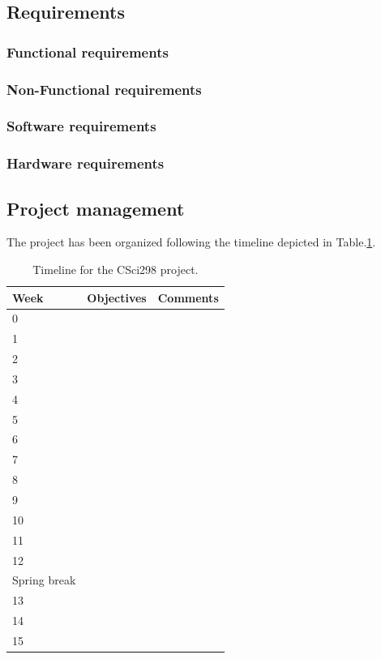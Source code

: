 \documentclass[12pt,onecolumn]{article}
\begin{document}
\subsection{Requirements}

\subsubsection{Functional requirements}

\subsubsection{Non-Functional requirements}

\subsubsection{Software requirements}

\subsubsection{Hardware requirements}

\subsection{Project management}

The project has been organized following the timeline depicted in Table.\ref{table:timeline}.

\begin{table}[!tb]
\caption{Timeline for the CSci298 project.}
\small
\label{table:timeline}
\centering
\begin{tabular}{|l|ll|}
\hline
Week & Objectives & Comments \\	\hline
0  &     &		\\
1  &     &		\\
2  &     &		\\
3  &     &		\\
4  &     &		\\
5  &     &		\\
6  &     &		\\
7  &     &		\\
8  &     &		\\
9  &     &		\\
10  &     &		\\
11  &     &		\\
12  &     &		\\
Spring break  &     &		\\
13  &     &		\\
14  &     &		\\
15  &     &		\\ \hline
\end{tabular}
\end{table}
\end{document}
